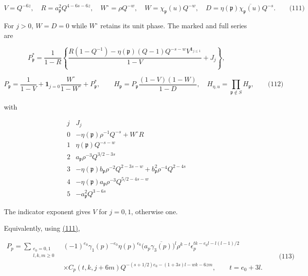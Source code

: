 \hypertarget{cf:eq:A.8}{}

\label{cf:eq:A.8}

\[
V=Q^{-6z},\quad R=a_{\mathfrak p}^2Q^{4-6s-6z},\quad
W^\circ=\rho Q^{-w},\quad
W=\chi_{\mathfrak p}(u)Q^{-w},\quad
D=\eta(\mathfrak p)\overline{\chi_{\mathfrak p}(u)}Q^{-s}.
\qquad\text{(111)}
\]

For \(j>0\), \(W=D=0\) while \(W^\circ\) retains its unit phase. The marked and full series are

\[
P_{\mathfrak p}^*=\frac1{1-R}
\left\{\frac{R(1-Q^{-1})-\eta(\mathfrak p)(Q-1)Q^{-s-w}V^{\mathbf1_{j\le1}}}{1-V}+J_j\right\},
\]

\hypertarget{cf:eq:A.9}{}

\label{cf:eq:A.9}

\[
P_{\mathfrak p}=\frac1{1-V}+\mathbf1_{j=0}\frac{W^\circ}{1-W^\circ}+P_{\mathfrak p}^*,
\qquad
H_{\mathfrak p}=P_{\mathfrak p}\frac{(1-V)(1-W)}{1-D},
\quad H_{\eta,u}=\prod_{\mathfrak p\notin S}H_{\mathfrak p},
\qquad\text{(112)}
\]

with

\[
\begin{array}{c|l}
j&J_j\\\hline
0&-\eta(\mathfrak p)\rho^{-1}Q^{-s}+W^\circ R\\
1&\eta(\mathfrak p)Q^{-s-w}\\
2&a_{\mathfrak p}\rho^{-3}Q^{3/2-3s}\\
3&-\eta(\mathfrak p)b_{\mathfrak p}\rho^{-2}Q^{2-3s-w}+b_{\mathfrak p}^2\rho^{-4}Q^{2-4s}\\
4&-\eta(\mathfrak p)a_{\mathfrak p}\rho^{-3}Q^{5/2-4s-w}\\
5&-a_{\mathfrak p}^2Q^{3-6s}
\end{array}
\]

The indicator exponent gives \(V\) for \(j=0,1\), otherwise one.

Equivalently, using \protect\hyperlink{cf:eq:A.8}{(111)},

\hypertarget{cf:eq:A.10}{}

\label{cf:eq:A.10}

\[
\begin{aligned}
P_p=\sum_{\substack{e_0=0,1\\l,k,m\ge0}}
&(-1)^{e_0}\gamma_1(p)^{-e_0}\eta(p)^{e_0}
\bigl(a_p\overline{\gamma_3(p)}\bigr)^l
\rho^{k-t}\epsilon_p^{tk-e_0l-l(l-1)/2}\\
&\times C_p(t,k,j+6m)
Q^{-(s+1/2)e_0-(1+3s)l-wk-6zm},\qquad t=e_0+3l.
\end{aligned}
\qquad\text{(113)}
\]

